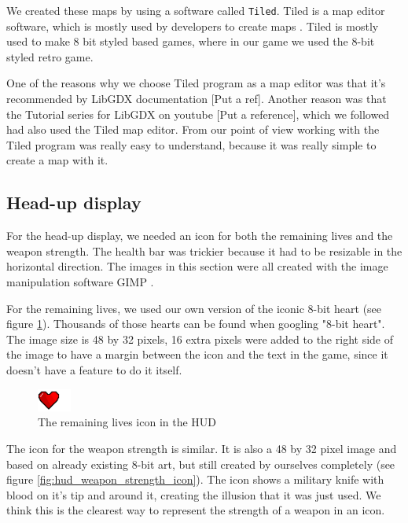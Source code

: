 \documentclass[12p]{article}
\begin{document}
We created these maps by using a software called \texttt{Tiled}. Tiled is a map editor software, which is mostly used by developers to create maps \cite{TiledMapEditor}. Tiled is mostly used to make 8 bit styled based games, where in our game we used the 8-bit styled retro game.

One of the reasons why we choose Tiled program as a map editor was that it's recommended by LibGDX documentation [Put a ref]. Another reason was that the Tutorial series for LibGDX on youtube [Put a reference], which we followed had also used the Tiled map editor. From our point of view working with the Tiled program was really easy to understand, because it was really simple to create a map with it.

\subsection{Head-up display}

For the head-up display, we needed an icon for both the remaining lives and the weapon strength. The health bar was trickier because it had to be resizable in the horizontal direction. The images in this section were all created with the image manipulation software GIMP \cite{GIMP}.

For the remaining lives, we used our own version of the iconic 8-bit heart (see figure \ref{fig:hud_heart_icon}). Thousands of those hearts can be found when googling "8-bit heart". The image size is 48 by 32 pixels, 16 extra pixels were added to the right side of the image to have a margin between the icon and the text in the game, since it doesn't have a feature to do it itself.

\begin{figure}[ht]
  \center
  \includegraphics[width=0.1\textwidth]{Documentation/heart_icon.png}
  \caption{The remaining lives icon in the HUD}
  \label{fig:hud_heart_icon}
\end{figure}

The icon for the weapon strength is similar. It is also a 48 by 32 pixel image and based on already existing 8-bit art, but still created by ourselves completely (see figure \ref{fig:hud_weapon_strength_icon}). The icon shows a military knife with blood on it's tip and around it, creating the illusion that it was just used. We think this is the clearest way to represent the strength of a weapon in an icon.
\end{document}
